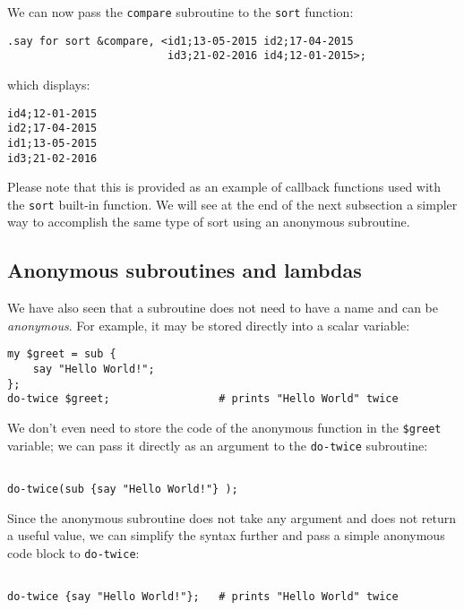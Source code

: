 We can now pass the {\tt compare} subroutine to the 
{\tt sort} function:
\begin{verbatim}
.say for sort &compare, <id1;13-05-2015 id2;17-04-2015 
                         id3;21-02-2016 id4;12-01-2015>;
\end{verbatim}

which displays:
\begin{verbatim}
id4;12-01-2015
id2;17-04-2015
id1;13-05-2015
id3;21-02-2016
\end{verbatim}

Please note that this is provided as an example of callback 
functions used with the {\tt sort} built-in function. We will 
see at the end of the next subsection a simpler way to accomplish 
the same type of sort using an anonymous subroutine. 

\subsection{Anonymous subroutines and lambdas}

We have also seen that a subroutine does not need to 
have a name and can be \emph{anonymous}. For example, 
it may be stored directly into a scalar variable:

\begin{verbatim}
my $greet = sub {
    say "Hello World!";
};
do-twice $greet;                 # prints "Hello World" twice
\end{verbatim}

We don't even need to store the code of the anonymous function 
in the \verb'$greet' variable; we can pass it directly as an 
argument to the {\tt do-twice} subroutine:

\begin{verbatim}

do-twice(sub {say "Hello World!"} );
\end{verbatim}

Since the anonymous subroutine does not take any argument 
and does not return a useful value, we can simplify the 
syntax further and pass a simple anonymous code block 
to {\tt do-twice}:

\begin{verbatim}

do-twice {say "Hello World!"};   # prints "Hello World" twice
\end{verbatim}

